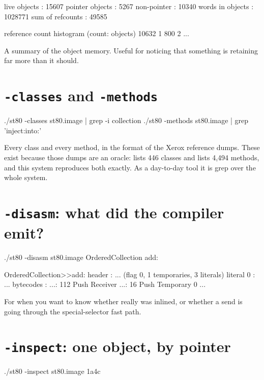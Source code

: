 \begin{plain}
live objects     : 15607
pointer objects  : 5267
non-pointer      : 10340
words in objects : 1028771
sum of refcounts : 49585

reference count histogram (count: objects)
 10632 1
   800 2
   ...
\end{plain}

A summary of the object memory. Useful for noticing that something is
retaining far more than it should.

\section{\texttt{-classes} and \texttt{-methods}}

\begin{sh}
./st80 -classes st80.image | grep -i collection
./st80 -methods st80.image | grep 'inject:into:'
\end{sh}

Every class and every method, in the format of the Xerox reference dumps.
These exist because those dumps are an oracle:  lists 446
classes and  lists 4,494 methods, and this system reproduces
both exactly. As a day-to-day tool it is grep over the whole system.

\section{\texttt{-disasm}: what did the compiler emit?}

\begin{sh}
./st80 -disasm st80.image OrderedCollection add:
\end{sh}

\begin{plain}
OrderedCollection>>add:
  header      : ... (flag 0, 1 temporaries, 3 literals)
  literal 0   : ...
  bytecodes   :
      ...: 112          Push Receiver
      ...:  16          Push Temporary 0
      ...
\end{plain}

For when you want to know whether  really was inlined, or whether
a send is going through the special-selector fast path.

\section{\texttt{-inspect}: one object, by pointer}

\begin{sh}
./st80 -inspect st80.image 1a4c
\end{sh}

